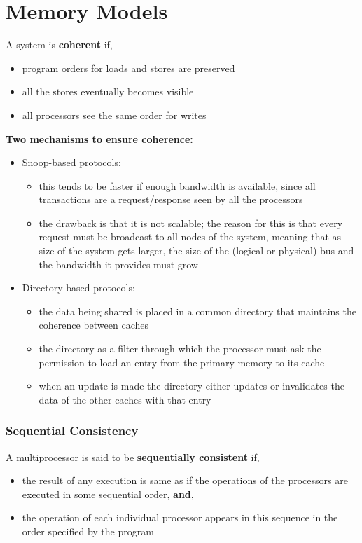 \documentclass[12pt, a4paper]{report}
\begin{document}
\section{Memory Models}
A system is {\bfseries{coherent}} if,
\begin{itemize}
    \item program orders for loads and stores are preserved
    \item all the stores eventually becomes visible
    \item all processors see the same order for writes
\end{itemize}
\vspace{5mm}
{\bfseries{Two mechanisms to ensure coherence:}}
\begin{itemize}
    \item {Snoop-based protocols:}
    \begin{itemize}
        \item this tends to be faster if enough bandwidth is available, since all transactions are a request/response seen by all the processors 
        \item the drawback is that it is not scalable; the reason for this is that every request must be broadcast to all nodes of the system, meaning that as
              size of the system gets larger, the size of the (logical or physical) bus and the bandwidth it provides must grow 
    \end{itemize}
    \item {Directory based protocols:}
    \begin{itemize}
        \item the data being shared is placed in a common directory that maintains the coherence between caches
        \item the directory as a filter through which the processor must ask the permission to load an entry from the primary memory to its cache
        \item when an update is made the directory either updates or invalidates the data of the other caches with that entry
    \end{itemize}
\end{itemize}

\subsubsection{Sequential Consistency}
A multiprocessor is said to be {\bfseries{sequentially consistent}} if,
\begin{itemize}
    \item the result of any execution is same as if the operations of the processors are executed in some sequential order, {\bfseries{and}},
    \item the operation of each individual processor appears in this sequence in the order specified by the program
\end{itemize}
\end{document}
